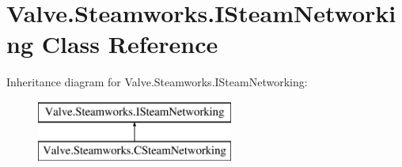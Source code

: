 \hypertarget{classValve_1_1Steamworks_1_1ISteamNetworking}{}\section{Valve.\+Steamworks.\+I\+Steam\+Networking Class Reference}
\label{classValve_1_1Steamworks_1_1ISteamNetworking}
Inheritance diagram for Valve.\+Steamworks.\+I\+Steam\+Networking\+:\begin{figure}[H]
\begin{center}
\leavevmode
\includegraphics[height=2.000000cm]{classValve_1_1Steamworks_1_1ISteamNetworking}
\end{center}
\end{figure}
